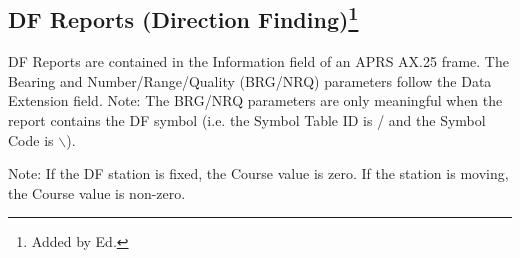 \subsection*{DF Reports (Direction Finding)\footnote {Added by Ed.}} %

DF Reports are contained in the Information field of an APRS AX.25
frame.  The Bearing and Number/Range/Quality (BRG/NRQ) parameters
follow the Data Extension field.  Note: The BRG/NRQ parameters are
only meaningful when the report contains the DF symbol (i.e. the
Symbol Table ID is / and the Symbol Code is $\backslash$).

 Note: If the DF station is fixed, the Course value is zero. If the station is
moving, the Course value is non-zero.




